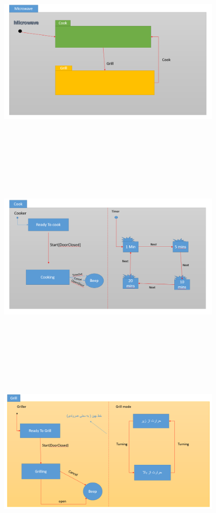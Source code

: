 \documentclass[12pt,a4paper]{article}							   %
\begin{document}
		\begin{figure}[h!]
		\centering
		\includegraphics*[height=10cm]{Microwave}
		\end{figure}
		
		\begin{figure}[h!]
		\centering
		\includegraphics*[height=10cm]{Cooker}
		\end{figure}
		
		\begin{figure}[h!]
		\centering
		\includegraphics*[height=10cm]{Griller}
		\end{figure}
\newpage
\end{document}
